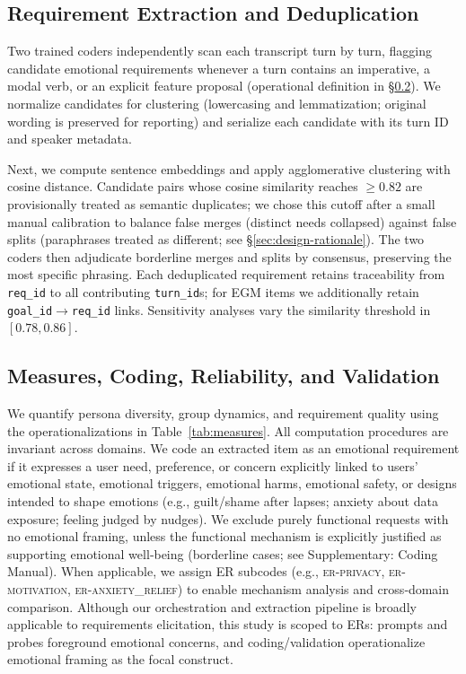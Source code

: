 \documentclass[acmsmall]{acmart}
\begin{document}
\subsection{Requirement Extraction and Deduplication}
\label{sec:extraction}

Two trained coders independently scan each transcript turn by turn, flagging candidate emotional requirements whenever a turn contains an imperative, a modal verb, or an explicit feature proposal (operational definition in \S\ref{sec:measures-validation}). We normalize candidates for clustering (lowercasing and lemmatization; original wording is preserved for reporting) and serialize each candidate with its turn ID and speaker metadata.

Next, we compute sentence embeddings and apply agglomerative clustering with cosine distance. Candidate pairs whose cosine similarity reaches $\geq 0.82$ are provisionally treated as semantic duplicates; we chose this cutoff after a small manual calibration to balance false merges (distinct needs collapsed) against false splits (paraphrases treated as different; see \S\ref{sec:design-rationale}). The two coders then adjudicate borderline merges and splits by consensus, preserving the most specific phrasing. Each deduplicated requirement retains traceability from \texttt{req\_id} to all contributing \texttt{turn\_id}s; for EGM items we additionally retain \texttt{goal\_id}$\rightarrow$\texttt{req\_id} links. Sensitivity analyses vary the similarity threshold in $[0.78, 0.86]$.

\subsection{Measures, Coding, Reliability, and Validation}
\label{sec:measures-validation}
We quantify persona diversity, group dynamics, and requirement quality using the operationalizations in Table~\ref{tab:measures}. All computation procedures are invariant across domains. We code an extracted item as an emotional requirement if it expresses a user need, preference, or concern explicitly linked to users' emotional state, emotional triggers, emotional harms, emotional safety, or designs intended to shape emotions (e.g., guilt/shame after lapses; anxiety about data exposure; feeling judged by nudges). We exclude purely functional requests with no emotional framing, unless the functional mechanism is explicitly justified as supporting emotional well‑being (borderline cases; see Supplementary: Coding Manual). When applicable, we assign ER subcodes (e.g., \textsc{er-privacy}, \textsc{er-motivation}, \textsc{er-anxiety\_relief}) to enable mechanism analysis and cross‑domain comparison.
Although our orchestration and extraction pipeline is broadly applicable to requirements elicitation, this study is scoped to ERs: prompts and probes foreground emotional concerns, and coding/validation operationalize emotional framing as the focal construct.
\end{document}
